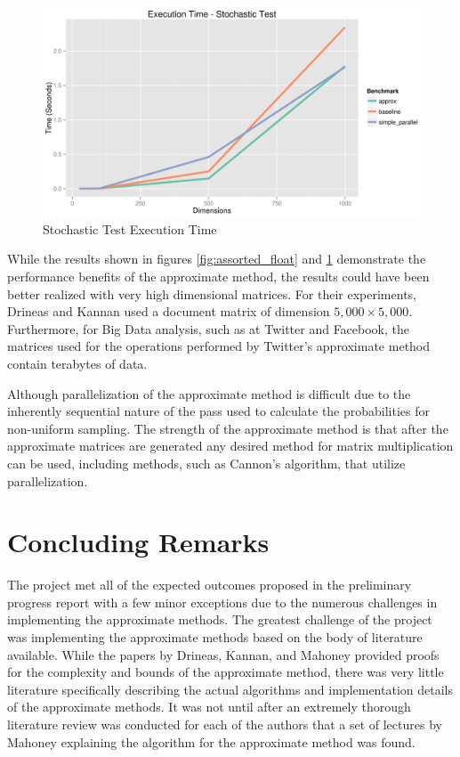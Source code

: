 \documentclass[oneside]{article}
\begin{document}
\begin{figure}[ht!]
\centering
\includegraphics[width=\textwidth]{figures/stochastic}
\caption{Stochastic Test Execution Time}
\label{fig:stochastic}
\end{figure}


While the results shown in figures \ref{fig:assorted_float} and \ref{fig:stochastic} demonstrate the performance benefits of the approximate method, the results could have been better realized with very high dimensional matrices. For their experiments, Drineas and Kannan used a document matrix of dimension $5,000 \times 5,000$\cite{drineas2001fast}. Furthermore, for Big Data analysis, such as at Twitter and Facebook, the matrices used for the operations performed by Twitter's approximate method contain terabytes of data\cite{zadeh2013dimension}.

Although parallelization of the approximate method is difficult due to the inherently sequential nature of the pass used to calculate the probabilities for non-uniform sampling. The strength of the approximate method is that after the approximate matrices are generated any desired method for matrix multiplication can be used, including methods, such as Cannon's algorithm, that utilize parallelization. 




\section{Concluding Remarks}

The project met all of the expected outcomes proposed in the preliminary progress report with a few minor exceptions due to the numerous challenges in implementing the approximate methods. The greatest challenge of the project was implementing the approximate methods based on the body of literature available. While the papers by Drineas, Kannan, and Mahoney provided proofs for the complexity and bounds of the approximate method\cite{drineas2001fast, drineas2006fastI, mahoney2011randomized}, there was very little literature specifically describing the actual algorithms and implementation details of the approximate methods. It was not until after an extremely thorough literature review was conducted for each of the authors that a set of lectures by Mahoney explaining the algorithm for the approximate method\cite{mahoneyCS369M, mahoneyCS294} was found.
\end{document}
